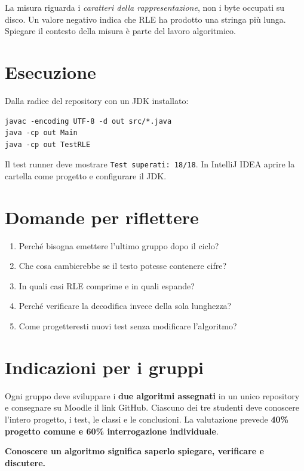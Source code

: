 \documentclass[11pt,a4paper]{article}
\begin{document}
La misura riguarda i \emph{caratteri della rappresentazione}, non i byte occupati su disco. Un valore negativo indica che RLE ha prodotto una stringa più lunga. Spiegare il contesto della misura è parte del lavoro algoritmico.

\section{Esecuzione}
Dalla radice del repository con un JDK installato:
\begin{lstlisting}
javac -encoding UTF-8 -d out src/*.java
java -cp out Main
java -cp out TestRLE
\end{lstlisting}
Il test runner deve mostrare \texttt{Test superati: 18/18}. In IntelliJ IDEA aprire la cartella come progetto e configurare il JDK.

\section{Domande per riflettere}
\begin{enumerate}[leftmargin=*]
\item Perché bisogna emettere l'ultimo gruppo dopo il ciclo?
\item Che cosa cambierebbe se il testo potesse contenere cifre?
\item In quali casi RLE comprime e in quali espande?
\item Perché verificare la decodifica invece della sola lunghezza?
\item Come progetteresti nuovi test senza modificare l'algoritmo?
\end{enumerate}

\section{Indicazioni per i gruppi}
Ogni gruppo deve sviluppare i \textbf{due algoritmi assegnati} in un unico repository e consegnare su Moodle il link GitHub. Ciascuno dei tre studenti deve conoscere l'intero progetto, i test, le classi e le conclusioni. La valutazione prevede \textbf{40\% progetto comune e 60\% interrogazione individuale}.

\bigskip
\begin{center}\color{blu}\textbf{Conoscere un algoritmo significa saperlo spiegare, verificare e discutere.}\end{center}
\end{document}
